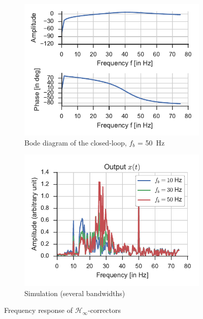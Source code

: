 \begin{figure}
    \centering
    \begin{subfigure}{0.49\textwidth}
        \includegraphics[width=\textwidth]{img/ctl_freqresp_hinf}
        \caption{\label{fig:ctl_freqresp_hinf} Bode diagram of the closed-loop, $f_b$ = \SI{50}{Hz}}
    \end{subfigure}
    \hfill
    \begin{subfigure}{0.49\textwidth}
        \includegraphics[width=\textwidth]{img/ctl_sim_hinf}
        \caption{\label{fig:ctl_sim_hinf}Simulation (several bandwidths)}
    \end{subfigure}    
    \caption{Frequency response of $\mathcal{H}_\infty$-correctors}
\end{figure}

